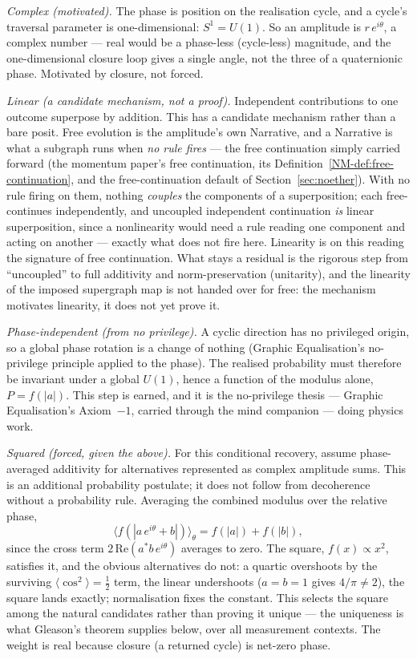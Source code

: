 \documentclass[11pt,a4paper]{article}
\theoremstyle{remark}\newtheorem{remark}[definition]{Remark}
\begin{document}
\emph{Complex (motivated).} The phase is position on the realisation cycle, and a
cycle's traversal parameter is one-dimensional: $S^1=U(1)$. So an amplitude is
$r\,e^{i\theta}$, a complex number --- real would be a phase-less (cycle-less)
magnitude, and the one-dimensional closure loop gives a single angle, not the three
of a quaternionic phase. Motivated by closure, not forced.

\emph{Linear (a candidate mechanism, not a proof).} Independent contributions to one
outcome superpose by addition. This has a candidate mechanism rather than a bare posit.
Free evolution is the amplitude's own Narrative, and a Narrative is what a subgraph runs
when \emph{no rule fires} --- the free continuation simply carried forward
(the momentum paper's free continuation, its
Definition~\ref{NM-def:free-continuation}, and the free-continuation default of
Section~\ref{sec:noether}). With no rule firing on them, nothing \emph{couples} the components of
a superposition; each free-continues independently, and uncoupled independent continuation
\emph{is} linear superposition, since a nonlinearity would need a rule reading one
component and acting on another --- exactly what does not fire here. Linearity is on this
reading the signature of free continuation. What stays a residual is the rigorous step
from ``uncoupled'' to full additivity and norm-preservation (unitarity), and the
linearity of the imposed supergraph map is not handed over for free: the mechanism
motivates linearity, it does not yet prove it.

\emph{Phase-independent (from no privilege).} A cyclic direction has no privileged
origin, so a global phase rotation is a change of nothing (Graphic Equalisation's
no-privilege principle applied to the phase). The realised probability must
therefore be invariant under a global $U(1)$, hence a function of the modulus alone,
$P=f(|a|)$. This step is earned, and it is the no-privilege thesis --- Graphic
Equalisation's Axiom~$-1$, carried through the mind companion --- doing physics
work.

\emph{Squared (forced, given the above).} For this conditional recovery, assume phase-averaged additivity for alternatives represented as complex amplitude sums. This is an additional probability postulate; it does not follow from decoherence without a probability rule. Averaging the combined modulus over the
relative phase,
\[
\big\langle f(|a\,e^{i\theta}+b|)\big\rangle_\theta = f(|a|)+f(|b|),
\]
since the cross term $2\,\mathrm{Re}(a^\ast b\,e^{i\theta})$ averages to zero. The
square, $f(x)\propto x^{2}$, satisfies it, and the obvious alternatives do not: a quartic
overshoots by the surviving $\langle\cos^{2}\rangle=\tfrac12$ term, the linear
undershoots ($a=b=1$ gives $4/\pi\neq2$), the square lands exactly; normalisation
fixes the constant. This selects the square among the natural candidates rather than proving
it unique --- the uniqueness is what Gleason's theorem supplies below, over all measurement
contexts. The weight is real because closure (a returned cycle) is net-zero phase.
\end{document}
